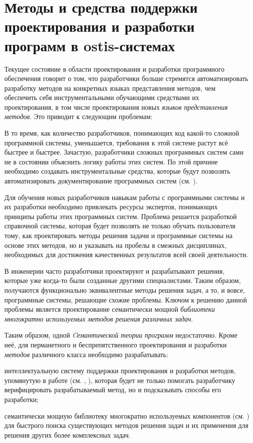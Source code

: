\section{Методы и средства поддержки проектирования и разработки программ в ostis-системах}
\label{sec_programs_help_system}

Текущее состояние в области проектирования и разработки программного обеспечения говорит о том, что разработчики больше стремятся автоматизировать разработку методов на конкретных языках представления методов, чем обеспечить себя инструментальными обучающими средствами их проектирования, в том числе проектирования новых \textit{языков представления методов}. Это приводит к следующим проблемам:
\begin{textitemize}
	\item В то время, как количество разработчиков, понимающих код какой-то сложной программной системы, уменьшается, требования к этой системе растут всё быстрее и быстрее. Зачастую, разработчики сложных программных систем сами не в состоянии объяснить логику работы этих систем. По этой причине необходимо создавать инструментальные средства, которые будут позволять автоматизировать документирование программных систем (см. ).
	\item Для обучения новых разработчиков навыкам работы с программными системы и их разработки необходимо привлекать ресурсы экспертов, понимающих принципы работы этих программных систем. Проблема решается разработкой справочной системы, которая будет позволять не только обучать пользователя тому, как проектировать методы решения задачи и программные системы на основе этих методов, но и указывать на пробелы в смежных дисциплинах, необходимых для достижения качественных результатов всей своей деятельности.
	\item В инженерии часто разработчики проектируют и разрабатывают решения, которые уже когда-то были созданные другими специалистами. Таким образом, получаются функционально эквивалентные методы решения задач, а то, и вовсе, программные системы, решающие схожие проблемы. Ключом к решению данной проблемы является проектирование семантически мощной \textit{библиотеки многократно используемых методов решения различных задач}.
\end{textitemize}

Таким образом, одной \textit{Cемантической теории программ} недостаточно. Кроме неё, для перманетного и беспрепятственного проектирования и разработки \textit{методов} различного класса необходимо разрабатывать:
\begin{textitemize}
	\item интеллектуальную систему поддержки проектирования и разработки методов, упомянутую в работе (см. , ), которая будет не только помогать разработчику верифицировать разрабатываемый метод, но и подсказывать способы его разработки;
	\item семантически мощную библиотеку многократно используемых компонентов (см. ) для быстрого поиска существующих методов решения задач и их применения для решения других более комплексных задач.
\end{textitemize}

